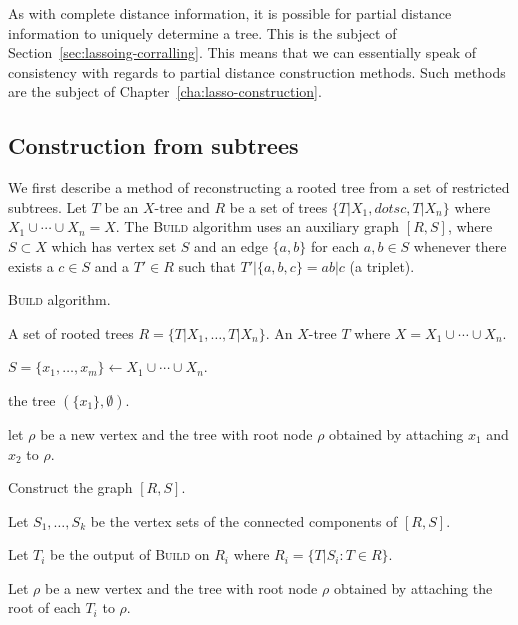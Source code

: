 As with complete distance information, it is possible for partial distance
information to uniquely determine a tree.  This is the subject of
Section~\ref{sec:lassoing-corralling}.  This means that we can essentially
speak of consistency with regards to partial distance construction methods.
Such methods are the subject of Chapter~\ref{cha:lasso-construction}.

\subsection{Construction from subtrees}
\label{sec:constr-from-subtr}

We first describe a method of reconstructing a rooted tree from a set of
restricted subtrees.  Let $T$ be an $X$-tree and $R$ be a set of trees
$\{T|X_1,dotsc,T|X_n\}$ where $X_1 \cup \dotsb \cup X_n = X$.  The
\textsc{Build} algorithm uses an auxiliary graph $[R,S]$, where $S \subset
X$ which has vertex set $S$ and an edge $\{a,b\}$ for each $a,b \in S$
whenever there exists a $c \in S$ and a $T' \in R$ such that $T'|\{a,b,c\} =
ab|c$ (a triplet).

\begin{algorithm}[h]
  \caption{\textsc{Build} algorithm.}
  \label{alg:build}

  \begin{algorithmic}
    \Require A set of rooted trees $R = \{T|X_1,\dotsc,T|X_n\}$.
    \Ensure  An $X$-tree $T$ where $X = X_1 \cup \dotsb \cup X_n$.

    \State $S = \{x_1,\dotsc,x_m\} \gets X_1 \cup \dotsb \cup X_n$.

     \Return the tree $(\{x_1\},\emptyset)$. \EndIf

     let $\rho$ be a new vertex and \Return the tree with root
    node $\rho$ obtained by attaching $x_1$ and $x_2$ to $\rho$. \EndIf

    \State Construct the graph $[R,S]$.

    \State Let $S_1,\dotsc,S_k$ be the vertex sets of the connected components
    of $[R,S]$.

    \State Let $T_i$ be the output of \textsc{Build} on $R_i$ where $R_i =
    \{T|S_i \colon T \in R\}$.
    \EndFor

    \State Let $\rho$ be a new vertex and \Return the tree with root node
    $\rho$ obtained by attaching the root of each $T_i$ to $\rho$.
    
  \end{algorithmic}
\end{algorithm}


